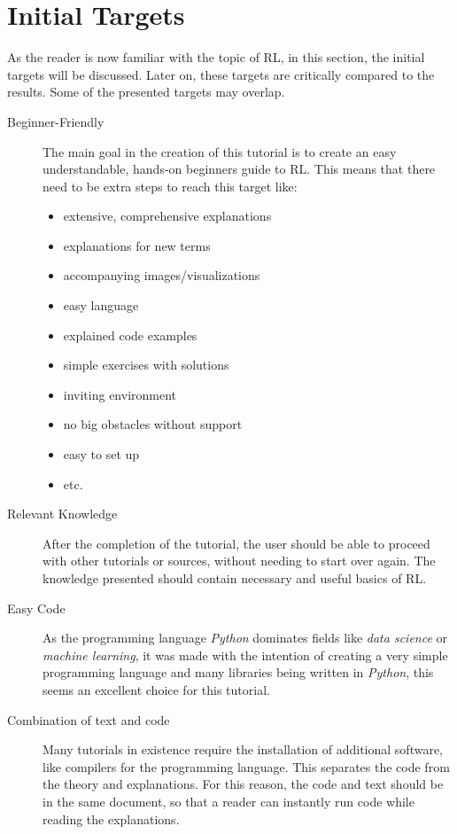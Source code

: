 \documentclass[a4paper]{article}
\begin{document}
	

	\section{Initial Targets}
		As the reader is now familiar with the topic of RL, in this section, the initial targets will be discussed. Later on, these targets are critically compared to the results. Some of the presented targets may overlap.
		
		\begin{description}
			\item[Beginner-Friendly] 	The main goal in the creation of this tutorial is to create an easy understandable, hands-on beginners guide to RL.
			This means that there need to be extra steps to reach this target like:
			\begin{itemize}
				\item extensive, comprehensive explanations
				\item explanations for new terms
				\item accompanying images/visualizations
				\item easy language
				\item explained code examples
				\item simple exercises with solutions
				\item inviting environment 
				\item no big obstacles without support
				\item easy to set up
				\item etc.
			\end{itemize}
		
			\item[Relevant Knowledge] After the completion of the tutorial, the user should be able to proceed with other tutorials or sources, without needing to start over again. The knowledge presented should contain necessary and useful basics of RL.
			
			\item[Easy Code] As the programming language \textit{Python} dominates fields like \textit{data science} or \textit{machine learning}, it was made with the intention of creating a very simple programming language and many libraries being written in \textit{Python}, this seems an excellent choice for this tutorial.\\ 
			
			\item[Combination of text and code] Many tutorials in existence require the installation of additional software, like compilers for the programming language. This separates the code from the theory and explanations. For this reason, the code and text should be in the same document, so that a reader can instantly run code while reading the explanations. 
			

\end{description}
\end{document}
